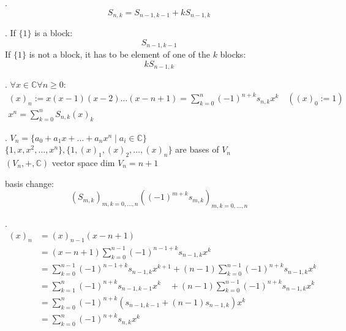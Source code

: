 \Theorem.
\[
  S_{n,k} = S_{n-1,k-1} + k S_{n-1,k}
\]

\Proof.
If $\{1\}$ is a block:
\[
  S_{n-1,k-1}
\]
If $\{1\}$ is not a block, it has to be element of one of the $k$ blocks:
\[
  k S_{n-1,k}
\]

\Theorem.
$\forall x\in \mathbb{C} \forall n ≥ 0:$
\begin{gather*}
  (x)_n
    := x(x-1)(x-2) \ldots(x-n+1)
    = \sum_{k=0}^{n} (-1)^{n+k} s_{n,k} x^k \quad ((x)_0:=1)
    \\
  x^n = \sum_{k=0}^{n} S_{n,k} (x)_k
\end{gather*}

\Remark.
$V_n = \{a_0 + a_1 x + \ldots + a_n x^n \mid a_i \in \mathbb{C} \}$ \\
$\{1,x,x^2, \ldots , x^n\}, \{1,(x)_1, (x)_2, \ldots ,(x)_n\}$ are bases of $V_n$ \\
$(V_n, +, \mathbb{C})$ vector space dim $V_n = n+1$

basis change: 
\[
  (S_{m,k})_{m,k= 0, \ldots,n} 
    ((-1)^{m+k} s_{m,k})_{m,k= 0, \ldots,n}
\]

\Proof.
\begin{align*}
  (x)_n
  &= (x)_{n-1} (x-n+1) \\
  &= (x-n+1) \sum_{k=0}^{n-1} (-1)^{n-1+k} s_{n-1,k} x^k \\
  &= \sum_{k=0}^{n-1} (-1)^{n-1+k} s_{n-1,k} x^{k+1} 
    + (n-1)\sum_{k=0}^{n-1} (-1)^{n+k} s_{n-1,k} x^k \\
  &= \sum_{k=1}^n (-1)^{n+k} s_{n-1,k-1} x^k
    \quad + (n-1)\sum_{k=0}^{n-1} (-1)^{n+k} s_{n-1,k} x^k \\
  &= \sum_{k=0}^n (-1)^{n+k}
    (s_{n-1,k-1} + (n-1)s_{n-1,k}) x^k \\
  &= \sum_{k=0}^n (-1)^{n+k} s_{n,k} x^k \\
\end{align*}

